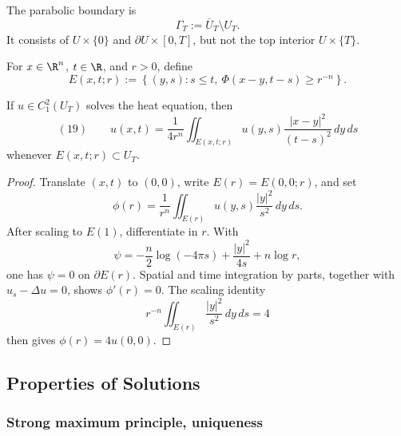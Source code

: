 \begin{definition}
\label{def:parabolic-boundary-heat-ball}
\leanok
The parabolic boundary is
$$\Gamma_T:=\overline U_T\setminus U_T.$$
It consists of $U\times\{0\}$ and $\partial U\times[0,T]$, but not the top
interior $U\times\{T\}$.
\end{definition}

\begin{definition}
\label{def:heat-ball}
\leanok
For $x\in\R^n$, $t\in\R$, and $r>0$, define
$$E(x,t;r):=
\left\{(y,s):s\le t,\ \Phi(x-y,t-s)\ge r^{-n}\right\}.$$
\end{definition}

\begin{theorem}
\label{thm:mean-value-property-heat-equation}
If $u\in C_1^2(U_T)$ solves the heat equation, then
$$(19)\qquad
u(x,t)=\frac1{4r^n}\iint_{E(x,t;r)}
u(y,s)\frac{|x-y|^2}{(t-s)^2}\,dy\,ds$$
whenever $E(x,t;r)\subset U_T$.
\end{theorem}
\begin{proof}
\sketch Translate $(x,t)$ to $(0,0)$, write $E(r)=E(0,0;r)$, and set
$$\phi(r)=\frac1{r^n}\iint_{E(r)}u(y,s)\frac{|y|^2}{s^2}\,dy\,ds.$$
After scaling to $E(1)$, differentiate in $r$. With
$$\psi=-\frac n2\log(-4\pi s)+\frac{|y|^2}{4s}+n\log r,$$
one has $\psi=0$ on $\partial E(r)$. Spatial and time integration by parts,
together with $u_s-\Delta u=0$, shows $\phi'(r)=0$. The scaling identity
$$r^{-n}\iint_{E(r)}\frac{|y|^2}{s^2}\,dy\,ds=4$$
then gives $\phi(r)=4u(0,0)$.
\end{proof}

\subsection{Properties of Solutions}
\label{sec:heat-properties-of-solutions}

\subsubsection{Strong maximum principle, uniqueness}
\label{sec:heat-strong-maximum-principle}

